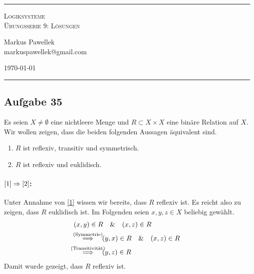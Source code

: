 \documentclass[9pt,fleqn,twoside,a4paper]{article}
\renewcommand{\implies}{\quad\Longrightarrow\quad}
\begin{document}
  \pagestyle{mainstyle}
  \thispagestyle{titlestyle}
  \hrule
  \begin{center}
    \huge
    \scshape
    Logiksysteme \\ Übungsserie 9: Lösungen
  \end{center}
  \medskip
  \footnotesize
  \begin{minipage}[c]{0.49\textwidth}
    Markus Pawellek \\
    markuspawellek@gmail.com
  \end{minipage}
  \hfill
  \begin{minipage}[c]{0.49\textwidth}
    \raggedleft
    \today
  \end{minipage}
  \medskip
  \normalsize
  \hrule
  \bigskip

  \begin{multicols}{2}

  \section*{Aufgabe 35} %
  \label{sec:aufgabe_35}

    Es seien $X\neq\emptyset$ eine nichtleere Menge und $R\subset X\times X$ eine binäre Relation auf $X$.
    Wir wollen zeigen, dass die beiden folgenden Aussagen äquivalent sind.
    \begin{enumerate}[label=\text{(\roman*)}]
      \item{
        \label{1}
        $R$ ist reflexiv, transitiv und symmetrisch.
      }
      \item{
        \label{2}
        $R$ ist reflexiv und euklidisch.
      }
    \end{enumerate}
    \paragraph{$\ref{1}\Rightarrow\ref{2}$:} %
      Unter Annahme von \ref{1} wissen wir bereits, dass $R$ reflexiv ist.
      Es reicht also zu zeigen, dass $R$ euklidisch ist.
      Im Folgenden seien $x,y,z\in X$ beliebig gewählt.
      \begin{align*}
        &(x,y)\in R \quad\&\quad (x,z)\in R \\
        &\stackrel{\mathclap{\text{(Symmetrie)}}}{\implies} (y,x)\in R \quad\&\quad (x,z)\in R \\
        &\stackrel{\mathclap{\text{(Transitivität)}}}{\implies} (y,z)\in R
      \end{align*}
      Damit wurde gezeigt, dass $R$ reflexiv ist.

\end{multicols}
\end{document}
